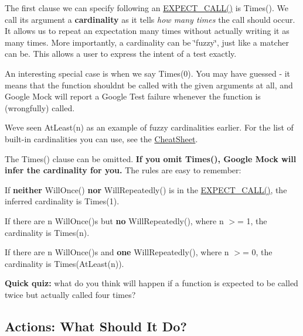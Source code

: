 The first clause we can specify following an {\ttfamily \hyperlink{gmock-spec-builders_8h_a535a6156de72c1a2e25a127e38ee5232}{E\+X\+P\+E\+C\+T\+\_\+\+C\+A\+L\+L()}} is {\ttfamily Times()}. We call its argument a {\bfseries cardinality} as it tells {\itshape how many times} the call should occur. It allows us to repeat an expectation many times without actually writing it as many times. More importantly, a cardinality can be \char`\"{}fuzzy\char`\"{}, just like a matcher can be. This allows a user to express the intent of a test exactly.

An interesting special case is when we say {\ttfamily Times(0)}. You may have guessed -\/ it means that the function shouldn\textquotesingle{}t be called with the given arguments at all, and Google Mock will report a Google Test failure whenever the function is (wrongfully) called.

We\textquotesingle{}ve seen {\ttfamily At\+Least(n)} as an example of fuzzy cardinalities earlier. For the list of built-\/in cardinalities you can use, see the \hyperlink{v1__7_2CheatSheet_8md}{Cheat\+Sheet}.

The {\ttfamily Times()} clause can be omitted. {\bfseries If you omit {\ttfamily Times()}, Google Mock will infer the cardinality for you.} The rules are easy to remember\+:


\begin{DoxyItemize}
\item If {\bfseries neither} {\ttfamily Will\+Once()} {\bfseries nor} {\ttfamily Will\+Repeatedly()} is in the {\ttfamily \hyperlink{gmock-spec-builders_8h_a535a6156de72c1a2e25a127e38ee5232}{E\+X\+P\+E\+C\+T\+\_\+\+C\+A\+L\+L()}}, the inferred cardinality is {\ttfamily Times(1)}.
\item If there are {\ttfamily n Will\+Once()}\textquotesingle{}s but {\bfseries no} {\ttfamily Will\+Repeatedly()}, where {\ttfamily n} $>$= 1, the cardinality is {\ttfamily Times(n)}.
\item If there are {\ttfamily n Will\+Once()}\textquotesingle{}s and {\bfseries one} {\ttfamily Will\+Repeatedly()}, where {\ttfamily n} $>$= 0, the cardinality is {\ttfamily Times(\+At\+Least(n))}.
\end{DoxyItemize}

{\bfseries Quick quiz\+:} what do you think will happen if a function is expected to be called twice but actually called four times?

\subsection*{Actions\+: What Should It Do?}

